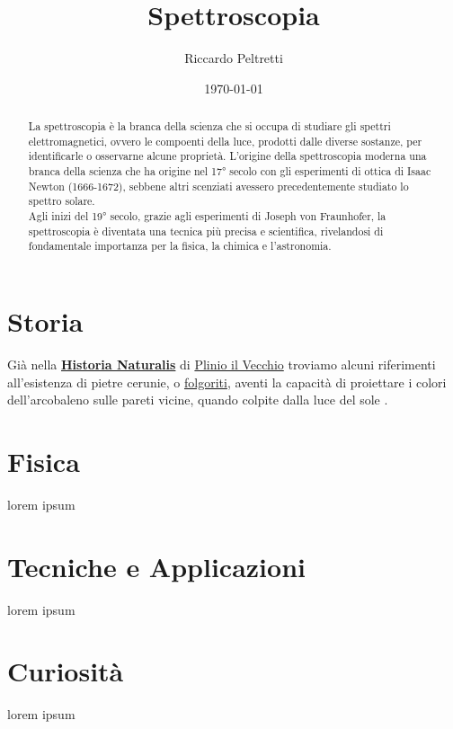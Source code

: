 \documentclass[12pt,a4paper, titlepage, oneside, draft]{article}
\title{Spettroscopia}
\author{Riccardo Peltretti}
\date{\today}
\begin{document}
    \maketitle
    
    \begin{abstract}
        La spettroscopia è la branca della scienza che si occupa di studiare gli spettri elettromagnetici, ovvero le compoenti della luce, prodotti dalle diverse sostanze, per identificarle o osservarne alcune proprietà. L'origine della spettroscopia moderna una branca della scienza che ha origine nel 17° secolo con gli esperimenti di ottica di Isaac Newton (1666-1672), sebbene altri scenziati avessero precedentemente studiato lo spettro solare.\\
        Agli inizi del 19° secolo, grazie agli esperimenti di Joseph von Fraunhofer, la spettroscopia è diventata una tecnica più precisa e scientifica, rivelandosi di fondamentale importanza per la fisica, la chimica e l'astronomia. 
    \end{abstract}

    \tableofcontents
    \clearpage

    \section{Storia}
    Già nella \href{https://it.wikipedia.org/wiki/Naturalis_historia}{\textbf{Historia Naturalis}} di \href{https://it.wikipedia.org/wiki/Plinio_il_Vecchio}{Plinio il Vecchio} troviamo alcuni riferimenti all'esistenza 
    di pietre cerunie, o \href{https://it.wikipedia.org/wiki/Folgorite}{folgoriti}, aventi la capacità di proiettare i colori dell'arcobaleno sulle pareti vicine, quando colpite dalla luce del sole \cite{naturalisHistoria}.\\
    
    \clearpage

    \section{Fisica}
    lorem ipsum
    \clearpage

    \section{Tecniche e Applicazioni}
    lorem ipsum
    \clearpage

    \section{Curiosità}
    lorem ipsum
    \clearpage

    \printbibliography
    \clearpage

    
\end{document}
